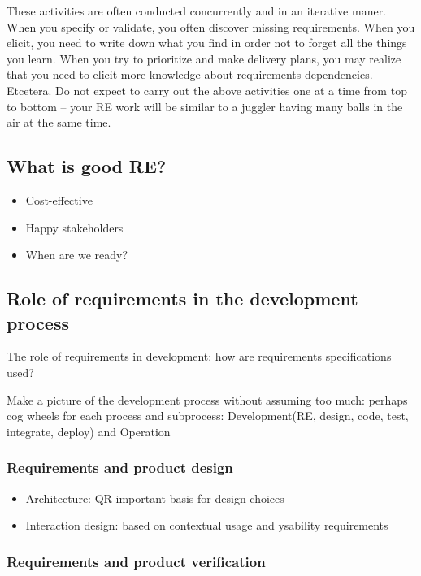 These activities are often conducted concurrently and in an iterative maner. When you specify or validate, you often discover missing requirements. When you elicit, you need to write down what you find in order not to forget all the things you learn. When you try to prioritize and make delivery plans, you may realize that you need to elicit more knowledge about requirements dependencies. Etcetera. Do not expect to carry out the above activities one at a time from top to bottom -- your RE work will be similar to a juggler having many balls in the air at the same time. 

\subsection{What is good RE?}

\begin{itemize}
  \item Cost-effective
  \item Happy stakeholders
  \item When are we ready?
\end{itemize}

\subsection{Role of requirements in the development process}
The role of requirements in development: how are requirements specifications used?

\TODO Make a picture of the development process without assuming too much: perhaps cog wheels for each process and subprocess: Development(RE, design, code, test, integrate, deploy) and Operation 

\subsubsection{Requirements and product design}

\begin{itemize}
  \item Architecture: QR important basis for design choices
  \item Interaction design: based on contextual usage and ysability requirements
\end{itemize}


\subsubsection{Requirements and product verification}

